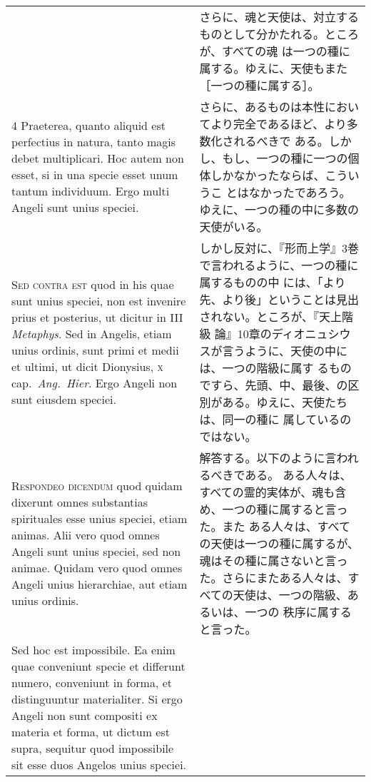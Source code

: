 \documentclass[10pt]{jsarticle} %
\begin{document}
\begin{longtable}{p{21em}p{21em}}
&

さらに、魂と天使は、対立するものとして分かたれる。ところが、すべての魂
 は一つの種に属する。ゆえに、天使もまた［一つの種に属する］。

\\


4 Praeterea, quanto aliquid est perfectius in
natura, tanto magis debet multiplicari. Hoc autem non esset, si in una
specie esset unum tantum individuum. Ergo multi Angeli sunt unius
speciei.


&


さらに、あるものは本性においてより完全であるほど、より多数化されるべきで
 ある。しかし、もし、一つの種に一つの個体しかなかったならば、こういうこ
 とはなかったであろう。ゆえに、一つの種の中に多数の天使がいる。

\\


{\scshape Sed contra est} quod in his quae sunt unius
speciei, non est invenire prius et posterius, ut dicitur in III
{\itshape Metaphys}. Sed in Angelis, etiam unius ordinis, sunt primi et medii et
ultimi, ut dicit Dionysius, {\scshape x} cap.~{\itshape Ang.~Hier}. Ergo Angeli non sunt
eiusdem speciei.


&

しかし反対に、『形而上学』3巻で言われるように、一つの種に属するものの中
 には、「より先、より後」ということは見出されない。ところが、『天上階級
 論』10章のディオニュシウスが言うように、天使の中には、一つの階級に属す
 るものですら、先頭、中、最後、の区別がある。ゆえに、天使たちは、同一の種に
 属しているのではない。


\\


{\scshape Respondeo dicendum} quod quidam dixerunt omnes
substantias spirituales esse unius speciei, etiam animas. Alii vero quod
omnes Angeli sunt unius speciei, sed non animae. Quidam vero quod omnes
Angeli unius hierarchiae, aut etiam unius ordinis. 



&

解答する。以下のように言われるべきである。
ある人々は、すべての霊的実体が、魂も含め、一つの種に属すると言った。また
 ある人々は、すべての天使は一つの種に属するが、魂はその種に属さないと言っ
 た。さらにまたある人々は、すべての天使は、一つの階級、あるいは、一つの
 秩序に属すると言った。


\\

Sed hoc est
impossibile. 
Ea enim quae conveniunt specie et differunt numero,
conveniunt in forma, et distinguuntur materialiter. Si ergo Angeli non
sunt compositi ex materia et forma, ut dictum est supra, sequitur quod
impossibile sit esse duos Angelos unius speciei. 



\end{longtable}
\end{document}
